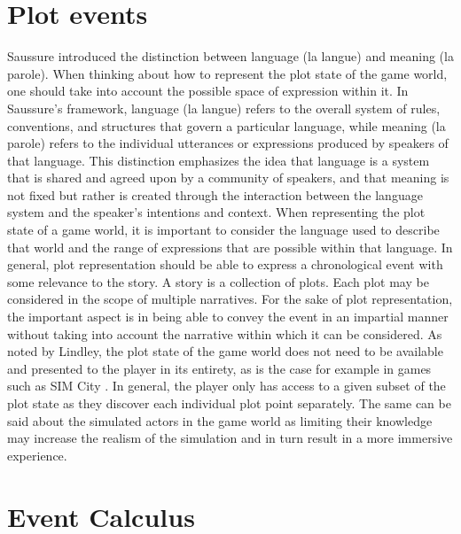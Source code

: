 
\section{Plot events}

Saussure introduced the distinction between language (la langue) and meaning (la parole)\cite{gordon2004langue}.
When thinking about how to represent the plot state of the game world, one should take into account the possible space of expression within it.
%
In Saussure's framework, language (la langue) refers to the overall system of rules, conventions, and structures that govern a particular language, while meaning (la parole) refers to the individual utterances or expressions produced by speakers of that language.
This distinction emphasizes the idea that language is a system that is shared and agreed upon by a community of speakers, and that meaning is not fixed but rather is created through the interaction between the language system and the speaker's intentions and context.
When representing the plot state of a game world, it is important to consider the language used to describe that world and the range of expressions that are possible within that language.
%
In general, plot representation should be able to express a chronological event with some relevance to the story.
A story is a collection of plots.
Each plot may be considered in the scope of multiple narratives.
For the sake of plot representation, the important aspect is in being able to convey the event in an impartial manner without taking into account the narrative within which it can be considered.
As noted by Lindley, the plot state of the game world does not need to be available and presented to the player in its entirety, as is the case for example in games such as SIM City \cite{lindley2005story}.
In general, the player only has access to a given subset of the plot state as they discover each individual plot point separately.
The same can be said about the simulated actors in the game world as limiting their knowledge may increase the realism of the simulation and in turn result in a more immersive experience.

\section{Event Calculus}

